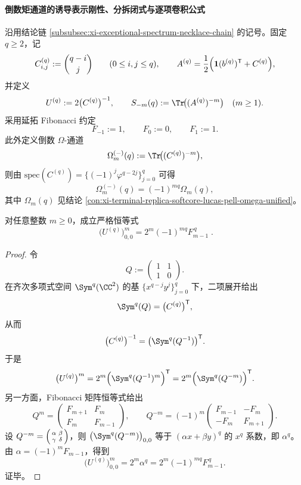 \paragraph{倒数矩通道的诱导表示刚性、分拆闭式与逐项卷积公式}
沿用结论链 \ref{subsubsec:xi-exceptional-spectrum-necklace-chain} 的记号。固定 \(q\ge 2\)，记
\[
C^{(q)}_{i,j}:=\binom{q-i}{j}\qquad(0\le i,j\le q),\qquad
A^{(q)}=\frac12\Bigl(\mathbf 1(b^{(q)})^{\mathsf T}+C^{(q)}\Bigr),
\]
并定义
\[
U^{(q)}:=2\bigl(C^{(q)}\bigr)^{-1},\qquad
S_{-m}(q):=\Tr\!\bigl((A^{(q)})^{-m}\bigr)\quad(m\ge1).
\]
采用延拓 Fibonacci 约定
\[
F_{-1}:=1,\qquad F_0:=0,\qquad F_1:=1.
\]
此外定义倒数 \(\Omega\)-通道
\[
\Omega_m^{(-)}(q):=\Tr\!\bigl((C^{(q)})^{-m}\bigr),
\]
则由 \(\mathrm{spec}(C^{(q)})=\{(-1)^j\varphi^{q-2j}\}_{j=0}^{q}\) 可得
\[
\Omega_m^{(-)}(q)=(-1)^{mq}\Omega_m(q),
\]
其中 \(\Omega_m(q)\) 见结论 \ref{con:xi-terminal-replica-softcore-lucas-pell-omega-unified}。

\begin{theorem}\label{thm:xi-replica-softcore-reciprocal-corner-fibonacci-power-law}
对任意整数 \(m\ge0\)，成立严格恒等式
\[
\boxed{\;
\bigl(U^{(q)}\bigr)^m_{0,0}
=2^m(-1)^{mq}F_{m-1}^{\,q}\; }.
\]
\end{theorem}
\begin{proof}
令
\[
Q:=\begin{pmatrix}1&1\\[2pt]1&0\end{pmatrix}.
\]
在齐次多项式空间 \(\Sym^q(\CC^2)\) 的基
\(
\{x^{q-j}y^j\}_{j=0}^{q}
\)
下，二项展开给出
\[
\Sym^q(Q)=\bigl(C^{(q)}\bigr)^{\mathsf T},
\]
从而
\[
\bigl(C^{(q)}\bigr)^{-1}
=\bigl(\Sym^q(Q^{-1})\bigr)^{\mathsf T}.
\]
于是
\[
\bigl(U^{(q)}\bigr)^m
=2^m\Bigl(\Sym^q(Q^{-1})^m\Bigr)^{\mathsf T}
=2^m\Bigl(\Sym^q(Q^{-m})\Bigr)^{\mathsf T}.
\]
另一方面，Fibonacci 矩阵恒等式给出
\[
Q^m=
\begin{pmatrix}
F_{m+1}&F_m\\
F_m&F_{m-1}
\end{pmatrix},
\qquad
Q^{-m}=(-1)^m
\begin{pmatrix}
F_{m-1}&-F_m\\
-F_m&F_{m+1}
\end{pmatrix}.
\]
设 \(Q^{-m}=\begin{psmallmatrix}\alpha&\beta\\ \gamma&\delta\end{psmallmatrix}\)，则
\(
\bigl(\Sym^q(Q^{-m})\bigr)_{0,0}
\)
等于 \((\alpha x+\beta y)^q\) 的 \(x^q\) 系数，即 \(\alpha^q\)。
由 \(\alpha=(-1)^mF_{m-1}\)，得到
\[
\bigl(U^{(q)}\bigr)^m_{0,0}
=2^m\alpha^q
=2^m(-1)^{mq}F_{m-1}^{\,q}.
\]
证毕。
\end{proof}

